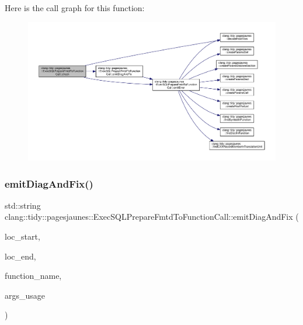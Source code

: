 Here is the call graph for this function\+:
\nopagebreak
\begin{figure}[H]
\begin{center}
\leavevmode
\includegraphics[width=350pt]{classclang_1_1tidy_1_1pagesjaunes_1_1_exec_s_q_l_prepare_fmtd_to_function_call_a2110f550c514850972d8fe7a57c9d754_cgraph}
\end{center}
\end{figure}
\mbox{\label{classclang_1_1tidy_1_1pagesjaunes_1_1_exec_s_q_l_prepare_fmtd_to_function_call_a384f21a310396151c6f01d282e0e484a}} 
\subsubsection{\texorpdfstring{emit\+Diag\+And\+Fix()}{emitDiagAndFix()}}
{\footnotesize\ttfamily std\+::string clang\+::tidy\+::pagesjaunes\+::\+Exec\+S\+Q\+L\+Prepare\+Fmtd\+To\+Function\+Call\+::emit\+Diag\+And\+Fix (\begin{DoxyParamCaption}\item[{const Source\+Location \&}]{loc\+\_\+start,  }\item[{const Source\+Location \&}]{loc\+\_\+end,  }\item[{const std\+::string \&}]{function\+\_\+name,  }\item[{const std\+::string \&}]{args\+\_\+usage }\end{DoxyParamCaption})}



